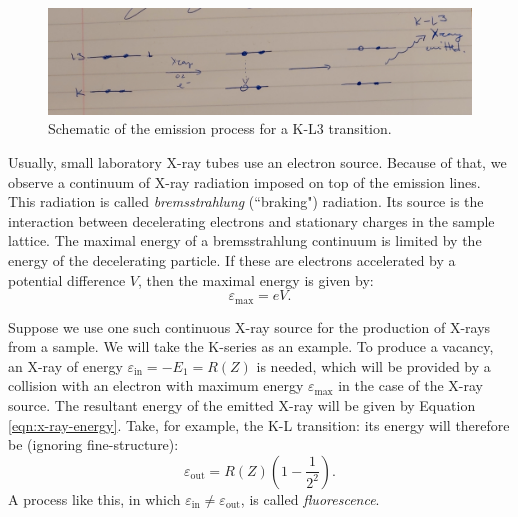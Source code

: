 \documentclass[11pt,a4paper,twoside,onecolumn]{article}
\newcommand{\rydberg}{R}
\begin{document}
\begin{figure}[!htbp]
    \centering
    \includegraphics[width=\textwidth]{img/emission-diagram.png}
    \caption{Schematic of the emission process for a K-L3 transition.}\label{fig:emission-diagram}
\end{figure}

Usually, small laboratory X-ray tubes use an electron source. Because of that, we observe a continuum of X-ray radiation imposed on top of the emission lines. This radiation is called \emph{bremsstrahlung} (``braking") radiation. Its source is the interaction between decelerating electrons and stationary charges in the sample lattice. The maximal energy of a bremsstrahlung continuum is limited by the energy of the decelerating particle. If these are electrons accelerated by a potential difference $V$, then the maximal energy is given by: 
\begin{equation}\label{eqn:bremss-energy-max}
    \varepsilon_\mathrm{max} = eV.
\end{equation}

Suppose we use one such continuous X-ray source for the production of X-rays from a sample. We will take the K-series as an example. To produce a vacancy, an X-ray of energy $\varepsilon_\mathrm{in} = - E_1 = \rydberg(Z)$ is needed, which will be provided by a collision with an electron with maximum energy $\varepsilon_\mathrm{max}$ in the case of the X-ray source. The resultant energy of the emitted X-ray will be given by Equation \eqref{eqn:x-ray-energy}. Take, for example, the K-L transition: its energy will therefore be (ignoring fine-structure):
\begin{equation}\label{eqn:Kalpha-energy-out}
    \varepsilon_\mathrm{out} = \rydberg\left(Z\right) \left(1 - \frac{1}{2^2}\right).
\end{equation}
A process like this, in which $\varepsilon_\mathrm{in} \neq \varepsilon_\mathrm{out}$, is called \emph{fluorescence}.
\end{document}
